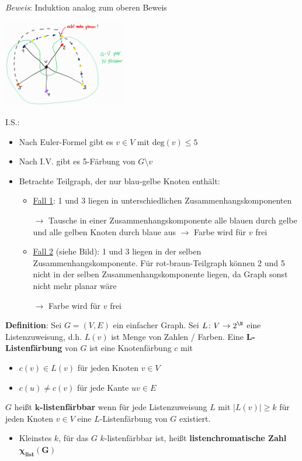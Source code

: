 \textit{Beweis}: Induktion analog zum oberen Beweis
\begin{center}
	\includegraphics[width=0.4\textwidth]{images/5-f.png}
\end{center}

I.S.:
\begin{itemize}
	\item Nach Euler-Formel gibt es $v\in V$ mit $\text{deg}(v)\leq 5$
	\item Nach I.V. gibt es 5-Färbung von $G\setminus v$
	\item Betrachte Teilgraph, der nur blau-gelbe Knoten enthält:
	\begin{itemize}
		\item \underline{Fall 1}: 1 und 3 liegen in unterschiedlichen Zusammenhangskomponenten
		
		$\rightarrow$ Tausche in einer Zusammenhangskomponente alle blauen durch gelbe und alle gelben Knoten durch blaue aus $\rightarrow$ Farbe wird für $v$ frei
		\item \underline{Fall 2} (siehe Bild): 1 und 3 liegen in der selben Zusammenhangskomponente. Für rot-braun-Teilgraph können 2 und 5 nicht in der selben Zusammenhangskomponente liegen, da Graph sonst nicht mehr planar wäre
		
		$\rightarrow$ Farbe wird für $v$ frei
	\end{itemize}
\end{itemize}
\bigskip
\textbf{Definition}: Sei $G=(V,E)$ ein einfacher Graph. Sei $L\colon V\rightarrow 2^\N$ eine Listenzuweisung, d.h. $L(v)$ ist Menge von Zahlen / Farben. Eine \textbf{$\boldsymbol{L}$-Listenfärbung} von $G$ ist eine Knotenfärbung $c$ mit
\begin{itemize}
	\item $c(v)\in L(v)$ für jeden Knoten $v\in V$
	\item $c(u)\neq c(v)$ für jede Kante $uv\in E$
\end{itemize}
$G$ heißt \textbf{$\boldsymbol{k}$-listenfärbbar} wenn für jede Listenzuweisung $L$ mit $|L(v)|\geq k$ für jeden Knoten $v\in V$ eine $L$-Listenfärbung von $G$ existiert.
\begin{itemize}
	\item Kleinstes $k$, für das $G$ $k$-listenfärbbar ist, heißt \textbf{listenchromatische Zahl $\boldsymbol{\chi_{\text{list}}(G)}$}
\end{itemize}
